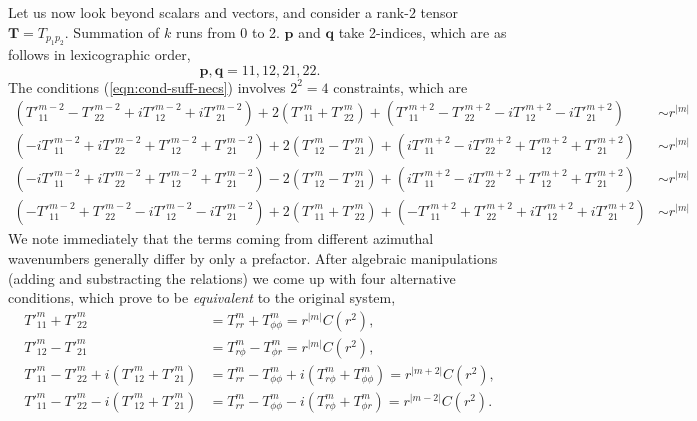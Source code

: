 \documentclass[a4paper, 11pt]{article}
\begin{document}
Let us now look beyond scalars and vectors, and consider a rank-$2$ tensor $\mathbf{T} = T_{p_1p_2}$. Summation of $k$ runs from 0 to 2. $\mathbf{p}$ and $\mathbf{q}$ take 2-indices, which are as follows in lexicographic order,
\[
    \mathbf{p},\mathbf{q} = 11, 12, 21, 22.
\]
The conditions (\ref{eqn:cond-suff-necs}) involves $2^2=4$ constraints, which are
\begin{equation}
\begin{aligned}
    \left(T'^{m-2}_{11} - T'^{m-2}_{22} + i T'^{m-2}_{12} + i T'^{m-2}_{21}\right) + 2\left(T'^m_{11} + T'^m_{22} \right)
    + \left(T'^{m+2}_{11} - T'^{m+2}_{22} - i T'^{m+2}_{12} - i T'^{m+2}_{21}\right) &\sim r^{|m|} \\ 
    \left(-iT'^{m-2}_{11} + iT'^{m-2}_{22} + T'^{m-2}_{12} + T'^{m-2}_{21}\right) + 2\left(T'^m_{12} - T'^m_{21} \right)
    + \left(iT'^{m+2}_{11} - iT'^{m+2}_{22} + T'^{m+2}_{12} + T'^{m+2}_{21}\right) &\sim r^{|m|} \\ 
    \left(-iT'^{m-2}_{11} + iT'^{m-2}_{22} + T'^{m-2}_{12} + T'^{m-2}_{21}\right) - 2\left(T'^m_{12} - T'^m_{21} \right)
    + \left(iT'^{m+2}_{11} - iT'^{m+2}_{22} + T'^{m+2}_{12} + T'^{m+2}_{21}\right) &\sim r^{|m|} \\ 
    \left(-T'^{m-2}_{11} + T'^{m-2}_{22} - i T'^{m-2}_{12} - i T'^{m-2}_{21}\right) + 2\left(T'^m_{11} + T'^m_{22} \right)
    + \left(- T'^{m+2}_{11} + T'^{m+2}_{22} + i T'^{m+2}_{12} + i T'^{m+2}_{21}\right) &\sim r^{|m|}
\end{aligned} 
\end{equation}
We note immediately that the terms coming from different azimuthal wavenumbers generally differ by only a prefactor. After algebraic manipulations (adding and substracting the relations) we come up with four alternative conditions, which prove to be \textit{equivalent} to the original system,
\begin{equation}\label{eqn:rank-2-conditions}
\begin{aligned}
    T'^m_{11} + T'^m_{22} &= T^m_{rr} + T^m_{\phi\phi} = r^{|m|} C(r^2),\\
    T'^m_{12} - T'^m_{21} &= T^m_{r\phi} - T^m_{\phi r} = r^{|m|} C(r^2),\\
    T'^m_{11} - T'^m_{22} + i \left(T'^m_{12} + T'^m_{21}\right) &= T^m_{rr} - T^m_{\phi\phi} + i \left(T^m_{r\phi} + T^m_{\phi\phi}\right) = r^{|m+2|} C(r^2), \\ 
    T'^m_{11} - T'^m_{22} - i \left(T'^m_{12} + T'^m_{21}\right) &= T^m_{rr} - T^m_{\phi\phi} - i \left(T^m_{r\phi} + T^m_{\phi r}\right) = r^{|m-2|} C(r^2).
\end{aligned}
\end{equation}
\end{document}
